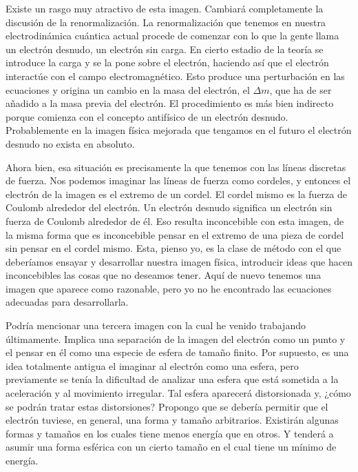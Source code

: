 \documentclass[a4paper, 12pt]{article}
\begin{document}
Existe un rasgo muy atractivo de esta imagen. Cambiará completamente la discusión de la renormalización. La renormalización que tenemos en nuestra electrodinámica cuántica actual procede de comenzar con lo que la gente llama un electrón desnudo, un electrón sin carga. En cierto estadio de la teoría se introduce la carga y se la pone sobre el electrón, haciendo así que el electrón interactúe con el campo electromagnético. Esto produce una perturbación en las ecuaciones y origina un cambio en la masa del electrón, el $\Delta m$, que ha de ser añadido a la masa previa del electrón. El procedimiento es más bien indirecto porque comienza con el concepto antifísico de un electrón desnudo. Probablemente en la imagen física mejorada que tengamos en el futuro el electrón desnudo no exista en absoluto.

Ahora bien, esa situación es precisamente la que tenemos con las líneas discretas de fuerza. Nos podemos imaginar las líneas de fuerza como cordeles, y entonces el electrón de la imagen es el extremo de un cordel. El cordel mismo es la fuerza de Coulomb alrededor del electrón. Un electrón desnudo significa un electrón sin fuerza de Coulomb alrededor de él. Eso resulta inconcebible con esta imagen, de la misma forma que es inconcebible pensar en el extremo de una pieza de cordel sin pensar en el cordel mismo. Esta, pienso yo, es la clase de método con el que deberíamos ensayar y desarrollar nuestra imagen física, introducir ideas que hacen inconcebibles las cosas que no deseamos tener. Aquí de nuevo tenemos una imagen que aparece como razonable, pero yo no he encontrado las ecuaciones adecuadas para desarrollarla.

Podría mencionar una tercera imagen con la cual he venido trabajando últimamente. Implica una separación de la imagen del electrón como un punto y el pensar en él como una especie de esfera de tamaño finito. Por supuesto, es una idea totalmente antigua el imaginar al electrón como una esfera, pero previamente se tenía la dificultad de analizar una esfera que está sometida a la aceleración y al movimiento irregular. Tal esfera aparecerá distorsionada y, ¿cómo se podrán tratar estas distorsiones? Propongo que se debería permitir que el electrón tuviese, en general, una forma y tamaño arbitrarios. Existirán algunas formas y tamaños en los cuales tiene menos energía que en otros. Y tenderá a asumir una forma esférica con un cierto tamaño en el cual tiene un mínimo de energía.
\end{document}
